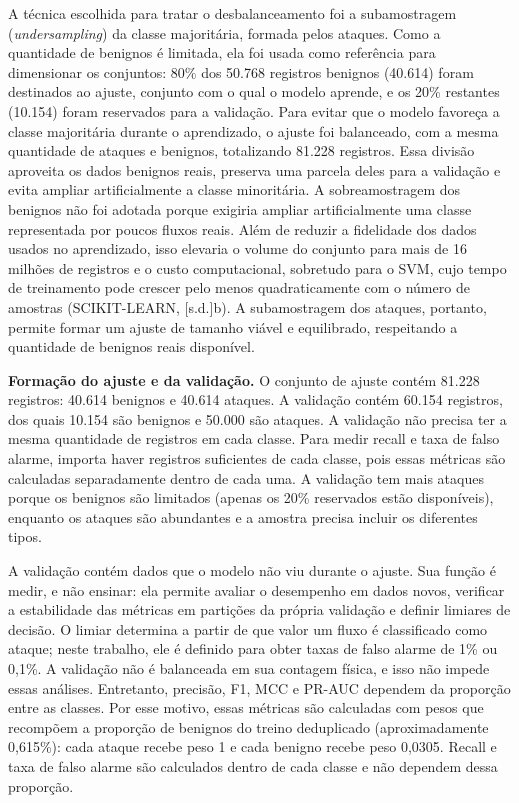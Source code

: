 \documentclass[
    12pt,                %
    openright,           %
    oneside,             %
    a4paper,             %
    english,             %
    brazil               %
]{abntex2}
\begin{document}
A técnica escolhida para tratar o desbalanceamento foi a subamostragem (\textit{undersampling}) da classe majoritária, formada pelos ataques. Como a quantidade de benignos é limitada, ela foi usada como referência para dimensionar os conjuntos: 80\% dos 50.768 registros benignos (40.614) foram destinados ao ajuste, conjunto com o qual o modelo aprende, e os 20\% restantes (10.154) foram reservados para a validação. Para evitar que o modelo favoreça a classe majoritária durante o aprendizado, o ajuste foi balanceado, com a mesma quantidade de ataques e benignos, totalizando 81.228 registros. Essa divisão aproveita os dados benignos reais, preserva uma parcela deles para a validação e evita ampliar artificialmente a classe minoritária. A sobreamostragem dos benignos não foi adotada porque exigiria ampliar artificialmente uma classe representada por poucos fluxos reais. Além de reduzir a fidelidade dos dados usados no aprendizado, isso elevaria o volume do conjunto para mais de 16 milhões de registros e o custo computacional, sobretudo para o SVM, cujo tempo de treinamento pode crescer pelo menos quadraticamente com o número de amostras (SCIKIT-LEARN, [s.d.]b). A subamostragem dos ataques, portanto, permite formar um ajuste de tamanho viável e equilibrado, respeitando a quantidade de benignos reais disponível.

\textbf{Formação do ajuste e da validação.} O conjunto de ajuste contém 81.228 registros: 40.614 benignos e 40.614 ataques. A validação contém 60.154 registros, dos quais 10.154 são benignos e 50.000 são ataques. A validação não precisa ter a mesma quantidade de registros em cada classe. Para medir recall e taxa de falso alarme, importa haver registros suficientes de cada classe, pois essas métricas são calculadas separadamente dentro de cada uma. A validação tem mais ataques porque os benignos são limitados (apenas os 20\% reservados estão disponíveis), enquanto os ataques são abundantes e a amostra precisa incluir os diferentes tipos.

A validação contém dados que o modelo não viu durante o ajuste. Sua função é medir, e não ensinar: ela permite avaliar o desempenho em dados novos, verificar a estabilidade das métricas em partições da própria validação e definir limiares de decisão. O limiar determina a partir de que valor um fluxo é classificado como ataque; neste trabalho, ele é definido para obter taxas de falso alarme de 1\% ou 0,1\%. A validação não é balanceada em sua contagem física, e isso não impede essas análises. Entretanto, precisão, F1, MCC e PR-AUC dependem da proporção entre as classes. Por esse motivo, essas métricas são calculadas com pesos que recompõem a proporção de benignos do treino deduplicado (aproximadamente 0,615\%): cada ataque recebe peso 1 e cada benigno recebe peso 0,0305. Recall e taxa de falso alarme são calculados dentro de cada classe e não dependem dessa proporção.
\end{document}
